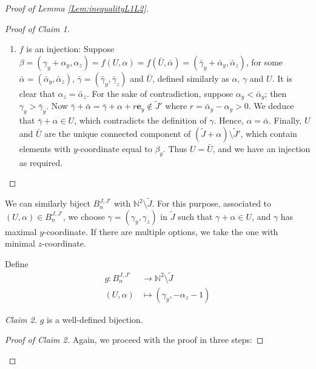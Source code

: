 \documentclass[11pt,a4paper,leqno,noamsfonts]{amsart}
\numberwithin{equation}{section}
\theoremstyle{definition}
\theoremstyle{thm}
\theoremstyle{ex}
\theoremstyle{sol}
\begin{document}
\begin{proof}[Proof of Lemma \ref{Lem:inequalityL1L2}]
\begin{proof}[Proof of Claim 1]
\begin{enumerate}
     \item $f$ is an injection: Suppose $\beta=(\gamma_y+\alpha_y,\alpha_z)=f(U,\alpha)=f(\bar{U},\bar{\alpha})=(\bar{\gamma}_y+\bar{\alpha}_y,\bar{\alpha}_z)$, for some $\bar{\alpha}=(\bar{\alpha}_y,\bar{\alpha}_z)$, $\bar{\gamma}=(\bar{\gamma}_y,\bar{\gamma}_z)$ and $\bar{U}$, defined similarly as $\alpha$, $\gamma$ and $U$. It is clear that $\alpha_z=\bar{\alpha}_z$. For the sake of contradiction, suppose $\alpha_y<\bar{\alpha}_y$; then $\gamma_y>\bar{\gamma}_y$. Now $\bar{\gamma}+\bar{\alpha}=\bar{\gamma}+\alpha+r\mathbf{e}_y\notin\tilde{J}'$ where $r=\bar{\alpha}_y-\alpha_y>0$. We deduce that $\bar{\gamma}+\alpha\in U$, which contradicts the definition of $\gamma$. Hence, $\alpha=\bar{\alpha}$. Finally, $U$ and $\bar{U}$ are the unique connected component of $(\tilde{J}+\alpha)\setminus\tilde{J}'$, which contain elements with $y$-coordinate equal to $\beta_y$. Thus $U=\bar{U}$, and we have an injection as required.
\end{enumerate}
\end{proof}
 

We can similarly biject $B^{J,J'}_n$ with $\mathbb{N}^2\setminus\tilde{J}$. For  this purpose, associated to $(U,\alpha)\in B^{J,J'}_n$, we choose $\gamma=(\gamma_y,\gamma_z)$ in $\tilde{J}$ such that $\gamma+\alpha\in U$, and $\gamma$ has maximal $y$-coordinate. If there are multiple options, we take the one with minimal $z$-coordinate. 

Define
\begin{align*}
    g:B^{J,J'}_n&\rightarrow \mathbb{N}^2\setminus\tilde{J}\\
    (U,\alpha)&\mapsto (\gamma_y,-\alpha_z-1)
\end{align*}

\emph{Claim 2.} $g$ is a well-defined bijection.

\begin{proof}[Proof of Claim 2] Again, we proceed with the proof in three steps:


\end{proof}
\end{proof}
\end{document}
